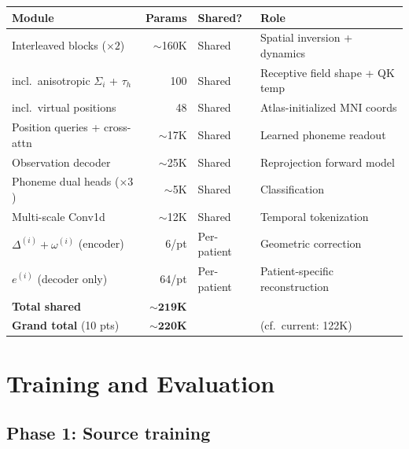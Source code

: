 \documentclass[11pt,letterpaper]{article}
\begin{document}
\begin{table}[ht!]\centering\small
\begin{tabular}{@{}lrll@{}}
\toprule
\textbf{Module} & \textbf{Params} & \textbf{Shared?} & \textbf{Role} \\
\midrule
Interleaved blocks ($\times 2$) & ${\sim}$160K & Shared & Spatial inversion + dynamics \\
\quad incl.\ anisotropic $\Sigma_i$ + $\tau_h$ & 100 & Shared & Receptive field shape + QK temp \\
\quad incl.\ virtual positions & 48 & Shared & Atlas-initialized MNI coords \\
Position queries + cross-attn & ${\sim}$17K & Shared & Learned phoneme readout \\
Observation decoder & ${\sim}$25K & Shared & Reprojection forward model \\
Phoneme dual heads ($\times 3$) & ${\sim}$5K & Shared & Classification \\
Multi-scale Conv1d & ${\sim}$12K & Shared & Temporal tokenization \\
\midrule
$\Delta^{(i)} + \omega^{(i)}$ (encoder) & 6/pt & Per-patient & Geometric correction \\
$e^{(i)}$ (decoder only) & 64/pt & Per-patient & Patient-specific reconstruction \\
\midrule
\textbf{Total shared} & $\mathbf{{\sim}219}$\textbf{K} & & \\
\textbf{Grand total} (10 pts) & $\mathbf{{\sim}220}$\textbf{K} & & (cf.\ current: 122K) \\
\bottomrule
\end{tabular}
\end{table}



\section{Training and Evaluation}\label{sec:training}

\subsection{Phase 1: Source training}
\end{document}
